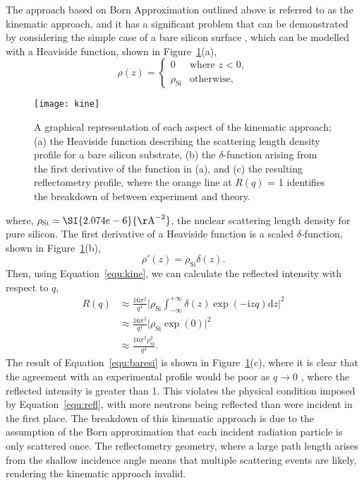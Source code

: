 \documentclass[
 reprint,
 superscriptaddress,
 amsmath,amssymb,
 aps,
]{revtex4-1}
\newcommand{\angstrom}{\rm{\AA}}
\begin{document}
The approach based on Born Approximation outlined above  is referred to as the kinematic approach, and it has a significant problem that can be demonstrated by considering the simple case of a bare silicon surface \cite{sivia_elementary_2011}, which can be modelled with a Heaviside function, shown in Figure~\ref{fig:kine}(a),
%
\begin{equation}
    \rho(z) =
    \begin{cases}
        0 & \text{where } z < 0,\\
        \rho_{\text{Si}} & \text{otherwise},
    \end{cases}
\end{equation}
%
%
\begin{figure}[t]
    \texttt{[image: kine]}
    \caption{A graphical representation of each aspect of the kinematic approach; (a) the Heaviside function describing the scattering length density profile for a bare silicon substrate, (b) the $\delta$-function arising from the first derivative of the function in (a), and (c) the resulting reflectometry profile, where the orange line at $R(q)$ = 1 identifies the breakdown of between experiment and theory.}
    \label{fig:kine}
\end{figure}
%
where, $\rho_{\text{Si}} = \SI{2.074e-6}{\angstrom^{-2}}$, the nuclear scattering length density for pure silicon.
The first derivative of a Heaviside function is a scaled $\delta$-function, shown in Figure~\ref{fig:kine}(b),
%
\begin{equation}
    \rho'(z) = \rho_{\text{Si}}\delta(z).
\end{equation}
%
Then, using Equation~\ref{equ:kine}, we can calculate the reflected intensity with respect to $q$,
%
\begin{equation}
    \begin{aligned}
    R(q) & \approx \frac{16\pi^2}{q^4} \bigg| \rho_{\text{Si}}\int^{+\infty}_{-\infty}{\delta(z)\exp{(-\mathrm{i} zq) \text{d}z}} \bigg|^2 \\
     & \approx \frac{16\pi^2}{q^4} \bigg| \rho_{\text{Si}} \exp{(0)} \bigg| ^2 \\
     & \approx \frac{16\pi^2\rho_{\text{Si}}^2}{q^4}.
    \end{aligned}
    \label{equ:baresi}
\end{equation}
%
The result of Equation~\ref{equ:baresi} is shown in Figure~\ref{fig:kine}(c), where it is clear that the agreement with an experimental profile would be poor as $q \to 0$ \cite{majkrzak_exact_1998}, where the reflected intensity is greater than \num{1}.
This violates the physical condition imposed by Equation~\ref{equ:refl}, with more neutrons being reflected than were incident in the first place.
The breakdown of this kinematic approach is due to the assumption of the Born approximation that each incident radiation particle is only scattered once.
The reflectometry geometry, where a large path length arises from the shallow incidence angle means that multiple scattering events are likely, rendering the kinematic approach invalid.
\end{document}
